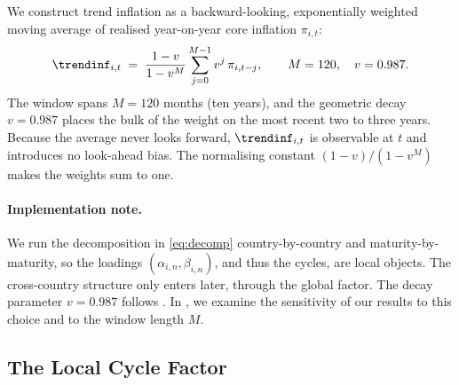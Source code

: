 We construct trend inflation as a backward-looking, exponentially weighted
moving average of realised year-on-year core inflation $\pi_{i,t}$:
\begin{equation}
  \trendinf_{i,t} \;=\; \frac{1-v}{1-v^{M}}\sum_{j=0}^{M-1} v^{j}\,\pi_{i,t-j},
  \qquad M=120,\quad v=0.987.
  \label{eq:trendinf}
\end{equation}
The window spans $M=120$ months (ten years), and the geometric decay
$v=0.987$ places the bulk of the weight on the most recent two to three years.
Because the average never looks forward, $\trendinf_{i,t}$ is observable at $t$
and introduces no look-ahead bias. The normalising constant $(1-v)/(1-v^{M})$
makes the weights sum to one.

\paragraph{Implementation note.} We run the decomposition in \eqref{eq:decomp}
country-by-country and maturity-by-maturity, so the loadings
$(\alpha_{i,n},\beta_{i,n})$, and thus the cycles, are local objects. The
cross-country structure only enters later, through the global factor. The decay
parameter $v=0.987$ follows \citet{cieslak2015}. In , we
examine the sensitivity of our results to this choice and to the window length
$M$.

\subsection{The Local Cycle Factor}
\label{sec:fw-localcf}

